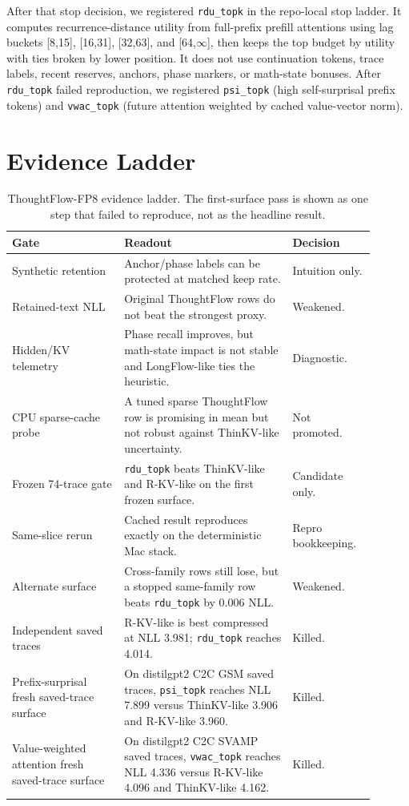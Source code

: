 \documentclass{article}
\begin{document}
After that stop decision, we registered \texttt{rdu\_topk} in the repo-local
stop ladder. It computes
recurrence-distance utility from full-prefix prefill attentions using lag buckets
[8,15], [16,31], [32,63], and [64,$\infty$], then keeps the top budget by utility
with ties broken by lower position. It does not use continuation tokens, trace
labels, recent reserves, anchors, phase markers, or math-state bonuses. After
\texttt{rdu\_topk} failed reproduction, we registered \texttt{psi\_topk}
(high self-surprisal prefix tokens) and \texttt{vwac\_topk} (future attention
weighted by cached value-vector norm).

\section{Evidence Ladder}

\begin{table}[h]
\centering
\small
\begin{tabular}{p{0.28\linewidth}p{0.42\linewidth}p{0.20\linewidth}}
\toprule
Gate & Readout & Decision \\
\midrule
Synthetic retention & Anchor/phase labels can be protected at matched keep rate. & Intuition only. \\
Retained-text NLL & Original ThoughtFlow rows do not beat the strongest proxy. & Weakened. \\
Hidden/KV telemetry & Phase recall improves, but math-state impact is not stable and LongFlow-like ties the heuristic. & Diagnostic. \\
CPU sparse-cache probe & A tuned sparse ThoughtFlow row is promising in mean but not robust against ThinKV-like uncertainty. & Not promoted. \\
Frozen 74-trace gate & \texttt{rdu\_topk} beats ThinKV-like and R-KV-like on the first frozen surface. & Candidate only. \\
Same-slice rerun & Cached result reproduces exactly on the deterministic Mac stack. & Repro bookkeeping. \\
Alternate surface & Cross-family rows still lose, but a stopped same-family row beats \texttt{rdu\_topk} by 0.006 NLL. & Weakened. \\
Independent saved traces & R-KV-like is best compressed at NLL 3.981; \texttt{rdu\_topk} reaches 4.014. & Killed. \\
Prefix-surprisal fresh saved-trace surface & On distilgpt2 C2C GSM saved traces, \texttt{psi\_topk} reaches NLL 7.899 versus ThinKV-like 3.906 and R-KV-like 3.960. & Killed. \\
Value-weighted attention fresh saved-trace surface & On distilgpt2 C2C SVAMP saved traces, \texttt{vwac\_topk} reaches NLL 4.336 versus R-KV-like 4.096 and ThinKV-like 4.162. & Killed. \\
\bottomrule
\end{tabular}
\caption{ThoughtFlow-FP8 evidence ladder. The first-surface pass is shown as one step that failed to reproduce, not as the headline result.}
\end{table}
\end{document}
